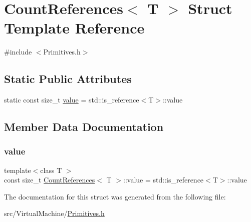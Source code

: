 \hypertarget{struct_count_references_3_01_t_01_4}{}\section{Count\+References$<$ T $>$ Struct Template Reference}
\label{struct_count_references_3_01_t_01_4}


{\ttfamily \#include $<$Primitives.\+h$>$}

\subsection*{Static Public Attributes}
\begin{DoxyCompactItemize}
\item 
static const size\+\_\+t \hyperlink{struct_count_references_3_01_t_01_4_a9e9c1c7749c5c42903d7115afe453ab2}{value} = std\+::is\+\_\+reference$<$T$>$\+::value
\end{DoxyCompactItemize}


\subsection{Member Data Documentation}
\mbox{\label{struct_count_references_3_01_t_01_4_a9e9c1c7749c5c42903d7115afe453ab2}} 
\subsubsection{\texorpdfstring{value}{value}}
{\footnotesize\ttfamily template$<$class T $>$ \\
const size\+\_\+t \hyperlink{struct_count_references}{Count\+References}$<$ T $>$\+::value = std\+::is\+\_\+reference$<$T$>$\+::value\hspace{0.3cm}{\ttfamily [static]}}



The documentation for this struct was generated from the following file\+:\begin{DoxyCompactItemize}
\item 
src/\+Virtual\+Machine/\hyperlink{_primitives_8h}{Primitives.\+h}\end{DoxyCompactItemize}
